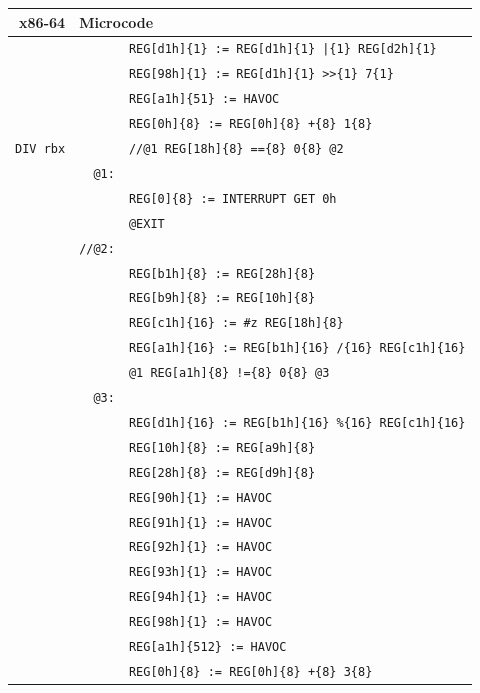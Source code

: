 \documentclass[10pt,twocolumn]{article}
\begin{document}
\begin{table}[!h]
\begin{center}
\begin{tabular}{r|rl}
\textbf{x86-64} & \multicolumn{2}{l}{\textbf{Microcode}}
\\ \hline

& & \texttt{REG[d1h]\{1\} := REG[d1h]\{1\} |\{1\} REG[d2h]\{1\}} \\ & %
& \texttt{REG[98h]\{1\} := REG[d1h]\{1\} >>\{1\} 7\{1\}} \\ & %
& \texttt{REG[a1h]\{51\} := HAVOC} \\ & %
& \texttt{REG[0h]\{8\} := REG[0h]\{8\} +\{8\} 1\{8\}} \\ \hline

\texttt{DIV rbx} & %
& \texttt{//@1 REG[18h]\{8\} ==\{8\} 0\{8\} @2} \\ & %
\texttt{@1:} \\ & %
& \texttt{REG[0]\{8\} := INTERRUPT GET 0h} \\ & %
& \texttt{@EXIT} \\ & %
\texttt{//@2:} \\ & %
& \texttt{REG[b1h]\{8\} := REG[28h]\{8\}} \\ & %
& \texttt{REG[b9h]\{8\} := REG[10h]\{8\}} \\ & %
& \texttt{REG[c1h]\{16\} := \#z REG[18h]\{8\}} \\ & %
& \texttt{REG[a1h]\{16\} := REG[b1h]\{16\} /\{16\} REG[c1h]\{16\}} \\ & %
& \texttt{@1 REG[a1h]\{8\} !=\{8\} 0\{8\} @3} \\ & %
\texttt{@3:} \\ & %
& \texttt{REG[d1h]\{16\} := REG[b1h]\{16\} \%\{16\} REG[c1h]\{16\}} \\ & %
& \texttt{REG[10h]\{8\} := REG[a9h]\{8\}} \\ & %
& \texttt{REG[28h]\{8\} := REG[d9h]\{8\}} \\ & %
& \texttt{REG[90h]\{1\} := HAVOC} \\ & %
& \texttt{REG[91h]\{1\} := HAVOC} \\ & %
& \texttt{REG[92h]\{1\} := HAVOC} \\ & %
& \texttt{REG[93h]\{1\} := HAVOC} \\ & %
& \texttt{REG[94h]\{1\} := HAVOC} \\ & %
& \texttt{REG[98h]\{1\} := HAVOC} \\ & %
& \texttt{REG[a1h]\{512\} := HAVOC} \\ & %
& \texttt{REG[0h]\{8\} := REG[0h]\{8\} +\{8\} 3\{8\}} \\ \hline


\end{tabular}
\end{center}
\end{table}
\end{document}
